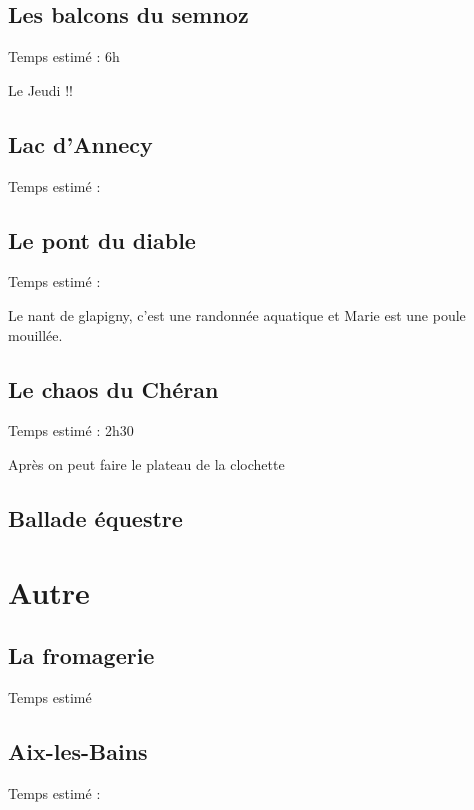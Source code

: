 \documentclass[12pt]{article}
\begin{document}
\subsection{Les balcons du semnoz}

Temps estimé : 6h

Le Jeudi !!

\subsection{Lac d'Annecy}

Temps estimé : 

\subsection{Le pont du diable}

Temps estimé :

Le nant de glapigny, c'est une randonnée aquatique et Marie est une poule mouillée.

\subsection{Le chaos du Chéran}

Temps estimé : 2h30

Après on peut faire le plateau de la clochette

\subsection{Ballade équestre}

\section{Autre}

\subsection{La fromagerie}

Temps estimé

\subsection{Aix-les-Bains}

Temps estimé : 
\end{document}
